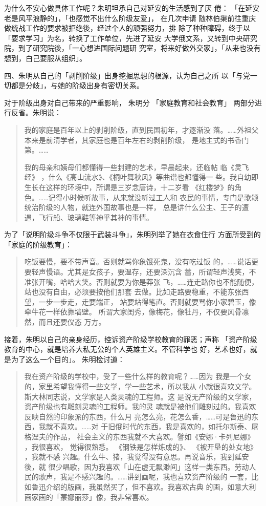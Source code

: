 为什么不安心做具体工作呢？朱明坦承自己对延安的生活感到了厌
倦：
「在延安老是风平浪静的」，「也感觉不出什么阶级友爱」，
在几次申请
随林伯渠前往重庆做统战工作的要求被拒绝後，经过个人的顽强努力，排
除了种种障碍，终于以「要求学习」为名，转换了工作单位，先进了延安
大学俄文系，又转到中央研究院，到了研究院後，「一心想进国际问题研
究室，将来好做外交家」，「从来也没有想到，白己要服从组织」。


四、朱明从自己的「剥削阶级」出身挖掘思想的根源，认为自己之所 以「与党一
切都是分歧」，与她的阶级出身有密切关系。

对于阶级出身对自己带来的严重影响，
朱明分
「家庭教育和社会教育」
两部分进行反省。朱明说：
\begin{quote}
	
{\fzwkai 我的家庭是百年以上的剥削阶级，直到民国初年，才逐渐没
落。……外祖父本来是前清学者，其家庭也是百年左右的剥削阶级，
是地主式的书香门第。……

我的母亲和姨母们都懂得一些封建的艺术，早晨起来，还临帖
临《灵飞经》
，什么《高山流水》、《桐叶舞秋风》等曲谱也都懂得一
些。我自幼即生长在这样的环境中，所谓是三岁念唐诗，十二岁看
《红楼梦》的角色。……记得小时候听故事，从来就没听过工人和
农民的事情，专门是歌颂统治阶级的人物，就连外国故事也是一样，
总是讲什么公主、王子的遭遇，飞行船、玻璃鞋等神乎其神的事情。} 
\end{quote}

为了「说明阶级斗争不仅限于武装斗争」，朱明列举了她在衣食住行
方面所受到的「家庭的阶级教育」：
\begin{quote}
	
{\fzwkai 吃饭要慢，要不带声音。否则就骂你象饿死鬼，没有吃过饭
的，……说话更要轻声慢语。尤其是女孩子，要温存，还要深沉含
蓄，所谓轻声浅笑，不准张开嘴，哈哈大笑。否则就要为你是莽张
飞，……连走路你也不能随便，站也没有自由，必须要按他们那套
去做。比如走路要稳重，不能东张西望，一步一步走，走要端正，
站要站得笔直。否则就要骂你小家碧玉，像牵牛花一样依靠墙壁。
所谓大家闺秀，像梅花，像牡丹，不仅要风骨凛然，而且还要仪态
万方。} 
\end{quote}

接着，朱明以自己的亲身经历，控诉资产阶级学校教育的罪恶；声称
「资产阶级教育的中心，就是培养大私无公的个人英雄主义。不管科学也
好，艺术也好，就是为了这么一个目的」。
朱明检讨道：
\begin{quote}
	
{\fzwkai 我在资产阶级的学校中，受了一些什么样的教育呢？……因为
我是一个女的，家里希望我懂得一些文学，学一些艺术，所以我从
小就很喜欢文学。斯大林同志说，文学家是人类灵魂的工程师。这
是说无产阶级的文学家，资产阶级也有雕刻灵魂的工程师。我的灵
魂就是被他们雕刻过的。我喜欢反映自然的印象派的东西，什么月
亮怎么亮，花怎么香，……可是鲁迅的东西，我就不喜欢。……对
于旧俄时代的东西，我是喜欢的，如托尔斯泰、屠格涅夫的作品，
社会主义的东西我就不大喜欢。譬如《安娜·卡列尼娜》
，我很喜欢，
觉得很熟悉。
《钢铁是怎样炼成的》、 《被开垦的处女地》
，我就不感
兴趣。什么牛、猪，我觉得没有意思。再说音乐，我到延安後，就
很少唱歌，因为我喜欢「山在虚无飘渺间」这样一类东西。劳动人
民的歌声，我是不感兴趣的。……讲到画呢，我也喜欢资产阶级的
一套，比如鲁迅介绍的版画，我虽然买了，但不喜欢。我喜欢古典
的画，如意大利画家画的「蒙娜丽莎」像，我非常喜欢。} 
\end{quote}

